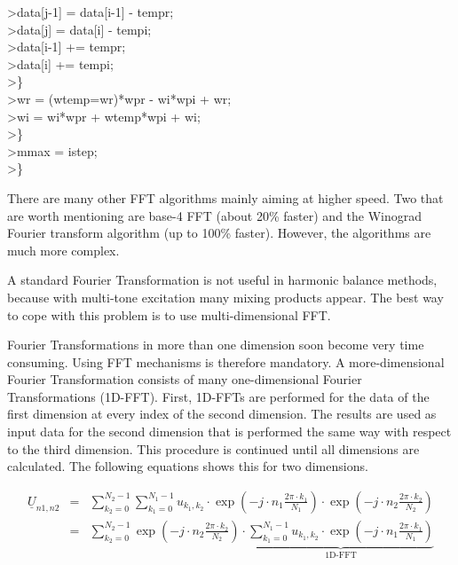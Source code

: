 {>\quad \qquad\qquad\qquad data[j-1] = data[i-1] - tempr; \\
>\quad \qquad\qquad\qquad data[j] = data[i] - tempi; \\
>\quad \qquad\qquad\qquad data[i-1] += tempr; \\
>\quad \qquad\qquad\qquad data[i] += tempi; \\
>\quad \qquad\qquad \} \\
>\quad \qquad\qquad wr = (wtemp=wr)*wpr - wi*wpi + wr; \\
>\quad \qquad\qquad wi = wi*wpr + wtemp*wpi + wi; \\
>\quad \qquad \} \\
>\quad \qquad mmax = istep; \\
>\quad \}
}

\addvspace{12pt}

There are many other FFT algorithms mainly aiming at higher speed.
Two that are worth mentioning are base-4 FFT (about 20\% faster)
and the Winograd Fourier transform algorithm (up to 100\% faster).
However, the algorithms are much more complex.

\addvspace{12pt}

A standard Fourier Transformation is not useful in harmonic balance
methods, because with multi-tone excitation many mixing products appear.
The best way to cope with this problem is to use multi-dimensional
FFT.

\addvspace{12pt}

Fourier Transformations in more than one dimension soon become
very time consuming. Using FFT mechanisms is therefore mandatory.
A more-dimensional Fourier Transformation consists of many
one-dimensional Fourier Transformations (1D-FFT). First, 1D-FFTs
are performed for the data of the first dimension at every index
of the second dimension. The results are used as input data for
the second dimension that is performed the same way with respect
to the third dimension. This procedure is continued until all
dimensions are calculated. The following equations shows this
for two dimensions.

\begin{eqnarray}
\underline{U}_{n1,n2} & = & \sum_{k_2=0}^{N_2-1} \sum_{k_1=0}^{N_1-1}
   u_{k_1,k_2}\cdot \exp\left( -j\cdot n_1\frac{2\pi\cdot k_1}{N_1} \right)
              \cdot \exp\left( -j\cdot n_2\frac{2\pi\cdot k_2}{N_2} \right) \\
 & = & \sum_{k_2=0}^{N_2-1} \exp\left( -j\cdot n_2\frac{2\pi\cdot k_2}{N_2} \right)
       \cdot \underbrace{ \sum_{k_1=0}^{N_1-1}
   u_{k_1,k_2}\cdot \exp\left( -j\cdot n_1\frac{2\pi\cdot k_1}{N_1} \right) }_\text{1D-FFT}
\end{eqnarray}


